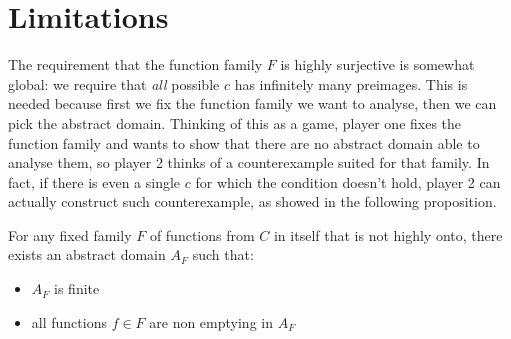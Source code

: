
\section{Limitations}
The requirement that the function family $F$ is highly surjective is somewhat global: we require that \textit{all} possible $c$ has infinitely many preimages.
This is needed because first we fix the function family we want to analyse, then we can pick the abstract domain. Thinking of this as a game, player one fixes the function family and wants to show that there are no abstract domain able to analyse them, so player 2 thinks of a counterexample suited for that family. In fact, if there is even a single $c$ for which the condition doesn't hold, player 2 can actually construct such counterexample, as showed in the following proposition.
\begin{prop}
	For any fixed family $F$ of functions from $C$ in itself that is not highly onto, there exists an abstract domain $A_F$ such that:
	\begin{itemize}
		\item $A_F$ is finite
		\item all functions $f \in F$ are non emptying in $A_F$
	\end{itemize}
\end{prop}
